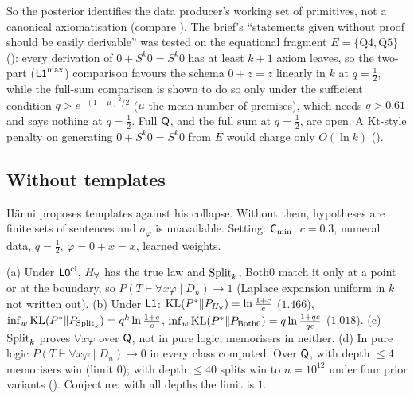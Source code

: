 \noindent So the posterior identifies the data producer's working set of primitives, not a canonical axiomatisation (compare ). The brief's ``statements given without proof should be easily derivable'' was tested on the equational fragment $E=\{\text{Q4},\text{Q5}\}$ (): every derivation of $0+S^k0=S^k0$ has at least $k+1$ axiom leaves, so the two-part ($\mathord{\mathsf{L1}}^{\max}$) comparison favours the schema $0+z=z$ linearly in $k$ at $q=\tfrac12$, while the full-sum comparison is shown to do so only under the sufficient condition $q>e^{-(1-\mu)^2/2}$ ($\mu$ the mean number of premises), which needs $q>0.61$ and says nothing at $q=\tfrac12$. Full $\mathsf{Q}$, and the full sum at $q=\tfrac12$, are open. A Kt-style penalty on generating $0+S^k0=S^k0$ from $E$ would charge only $O(\ln k)$ ().

\subsection{Without templates}\label{sec:univ:sentences}

H\"anni proposes templates against his collapse. Without them, hypotheses are finite sets of sentences and $\sigma_\varphi$ is unavailable. Setting: $\mathsf{C}_{\min}$, $c=0.3$, numeral data, $q=\tfrac12$, $\varphi=0+x=x$, learned weights.

\begin{proposition}\label{prop:univ:sentences}
\textup{(a)} Under $\mathord{\mathsf{L0}}^{\mathrm{cl}}$, $H_{\forall}$ has the true law and $\mathrm{Split}_k$, Both0 match it only at a point or at the boundary, so $P(T\vdash\forall x\varphi\mid D_n)\to1$ (Laplace expansion uniform in $k$ not written out). \textup{(b)} Under $\mathord{\mathsf{L1}}$: $\mathrm{KL}(P^*\|P_{H_{\forall}})=\ln\frac{1+c}c$ ($1.466$), $\inf_w\mathrm{KL}(P^*\|P_{\mathrm{Split}_k})=q^k\ln\frac{1+c}c$, $\inf_w\mathrm{KL}(P^*\|P_{\mathrm{Both0}})=q\ln\frac{1+qc}{qc}$ ($1.018$). \textup{(c)} $\mathrm{Split}_k$ proves $\forall x\varphi$ over $\mathsf{Q}$, not in pure logic; memorisers in neither. \textup{(d)} In pure logic $P(T\vdash\forall x\varphi\mid D_n)\to0$ in every class computed. Over $\mathsf{Q}$, with depth $\le4$ memorisers win (limit $0$); with depth $\le40$ splits win to $n=10^{12}$ under four prior variants (). Conjecture: with all depths the limit is $1$.
\end{proposition}


